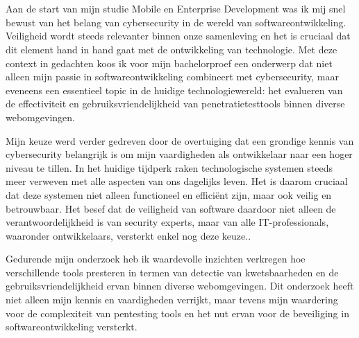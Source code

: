 
\chapter*{}%
\label{ch:voorwoord}


Aan de start van mijn studie Mobile en Enterprise Development was ik mij snel bewust van het belang van cybersecurity in de wereld van softwareontwikkeling. 
Veiligheid wordt steeds relevanter binnen onze samenleving en het is cruciaal dat dit element hand in hand gaat met de ontwikkeling van technologie. 
Met deze context in gedachten koos ik voor mijn bachelorproef een onderwerp dat niet alleen mijn passie in softwareontwikkeling combineert met cybersecurity, 
maar eveneens een essentieel topic in de huidige technologiewereld: het evalueren van de effectiviteit en gebruiksvriendelijkheid van 
penetratietesttools binnen diverse webomgevingen.

Mijn keuze werd verder gedreven door de overtuiging dat een grondige kennis van cybersecurity belangrijk is om mijn vaardigheden als ontwikkelaar naar een hoger niveau te tillen. In het huidige 
tijdperk raken technologische systemen steeds meer verweven met alle aspecten van ons dagelijks leven. Het is daarom cruciaal dat deze systemen niet alleen 
functioneel en efficiënt zijn, maar ook veilig en betrouwbaar. Het besef dat de veiligheid van software daardoor niet alleen de verantwoordelijkheid 
is van security experts, maar van alle IT-professionals, waaronder ontwikkelaars, versterkt enkel nog deze keuze..

Gedurende mijn onderzoek heb ik waardevolle inzichten verkregen hoe verschillende tools presteren in termen van detectie van kwetsbaarheden en de 
gebruiksvriendelijkheid ervan binnen diverse webomgevingen. Dit onderzoek heeft niet alleen mijn kennis en vaardigheden 
verrijkt, maar tevens mijn waardering voor de complexiteit van pentesting tools en het nut ervan voor de beveiliging in softwareontwikkeling versterkt.

